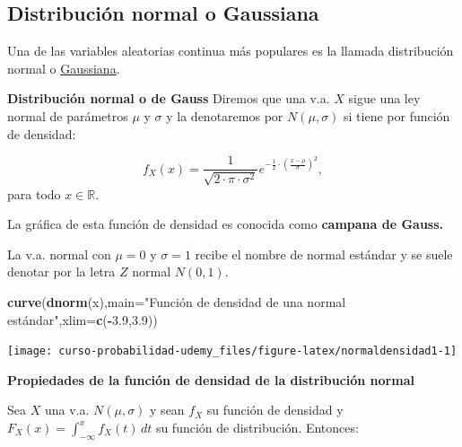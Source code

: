 \documentclass[]{book}
\newenvironment{Shaded}{\begin{snugshade}}{\end{snugshade}}
\newcommand{\DataTypeTok}[1]{\textcolor[rgb]{0.13,0.29,0.53}{#1}}
\newcommand{\FloatTok}[1]{\textcolor[rgb]{0.00,0.00,0.81}{#1}}
\newcommand{\KeywordTok}[1]{\textcolor[rgb]{0.13,0.29,0.53}{\textbf{#1}}}
\newcommand{\NormalTok}[1]{#1}
\newcommand{\OperatorTok}[1]{\textcolor[rgb]{0.81,0.36,0.00}{\textbf{#1}}}
\newcommand{\StringTok}[1]{\textcolor[rgb]{0.31,0.60,0.02}{#1}}
\begin{document}
\hypertarget{distribuciuxf3n-normal-o-gaussiana}{%
\subsection{Distribución normal o Gaussiana}\label{distribuciuxf3n-normal-o-gaussiana}}

Una de las variables aleatorias continua más populares es la llamada distribución normal o \href{https://es.wikipedia.org/wiki/Distribuci\%C3\%B3n_normal}{Gaussiana}.

 \textbf{Distribución normal o de Gauss}
Diremos que una v.a. \(X\) sigue una ley normal de parámetros
\(\mu\) y \(\sigma\) y la denotaremos por \(N(\mu,\sigma)\)
si tiene por función de densidad:

\[
f_{X}(x)=\frac1{\sqrt{2\cdot\pi\cdot\sigma^2}}
e^{-\frac{1}{2}\cdot\left(\frac{x-\mu}{\sigma}\right)^2},
\]
para todo \(x\in \mathbb{R}.\)

La gráfica de esta función de densidad es conocida como \textbf{campana de Gauss.}

La v.a. normal con \(\mu=0\) y \(\sigma=1\) recibe el nombre de
normal estándar y se suele denotar por la letra \(Z\) normal \(N(0,1)\).

\begin{Shaded}
\begin{Highlighting}[]
\KeywordTok{curve}\NormalTok{(}\KeywordTok{dnorm}\NormalTok{(x),}\DataTypeTok{main=}\StringTok{"Función de densidad de una normal estándar"}\NormalTok{,}\DataTypeTok{xlim=}\KeywordTok{c}\NormalTok{(}\OperatorTok{-}\FloatTok{3.9}\NormalTok{,}\FloatTok{3.9}\NormalTok{))}
\end{Highlighting}
\end{Shaded}

\begin{center}\texttt{[image: curso-probabilidad-udemy\_files/figure-latex/normaldensidad1-1]} \end{center}

 \textbf{Propiedades de la función de densidad de la distribución normal}

Sea \(X\) una v.a. \(N(\mu,\sigma)\) y sean \(f_{X}\) su función de densidad y \(F_X(x)=\displaystyle\int_{-\infty}^x f_X(t)\, dt\) su función de distribución. Entonces:
\end{document}
